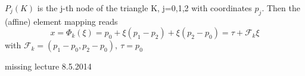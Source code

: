 \documentclass[english]{article}
\theoremstyle{definition}
\theoremstyle{remark}
\newcommand{\F}{\mathcal{F}}
\begin{document}
$P_j(K) $ is the j-th node of the triangle K, j=0,1,2 with coordinates $p_j$. Then the (affine) element mapping reads 
$$x= \Phi_k(\xi) = p_0 + \xi(p_1-p_2)+\xi(p_2-p_0) = \tau + \F_k \xi$$
with $\F_k= (p_1-p_0,p_2-p_0) , \ \tau = p_0$
\printindex  %



missing lecture 8.5.2014
\end{document}
